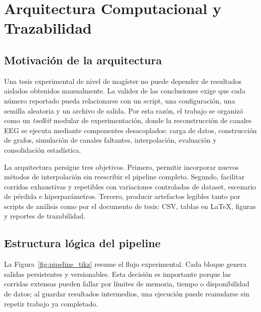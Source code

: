 \chapter{Arquitectura Computacional y Trazabilidad}
\label{chap:arquitectura}

\section{Motivación de la arquitectura}
Una tesis experimental de nivel de magíster no puede depender de resultados aislados obtenidos manualmente. La validez de las conclusiones exige que cada número reportado pueda relacionarse con un script, una configuración, una semilla aleatoria y un archivo de salida. Por esta razón, el trabajo se organizó como un \textit{toolkit} modular de experimentación, donde la reconstrucción de canales EEG se ejecuta mediante componentes desacoplados: carga de datos, construcción de grafos, simulación de canales faltantes, interpolación, evaluación y consolidación estadística.

La arquitectura persigue tres objetivos. Primero, permitir incorporar nuevos métodos de interpolación sin reescribir el pipeline completo. Segundo, facilitar corridas exhaustivas y repetibles con variaciones controladas de dataset, escenario de pérdida e hiperparámetros. Tercero, producir artefactos legibles tanto por scripts de análisis como por el documento de tesis: CSV, tablas en \LaTeX, figuras y reportes de trazabilidad.

\section{Estructura lógica del pipeline}
La Figura~\ref{fig:pipeline_tikz} resume el flujo experimental. Cada bloque genera salidas persistentes y versionables. Esta decisión es importante porque las corridas extensas pueden fallar por límites de memoria, tiempo o disponibilidad de datos; al guardar resultados intermedios, una ejecución puede reanudarse sin repetir trabajo ya completado.

